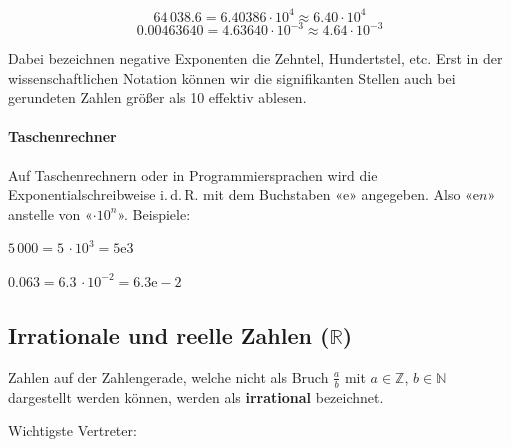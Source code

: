 $$64\,038.6  = 6.40386 \cdot 10^{ 4}\approx 6.40 \cdot 10^{ 4}$$
$$0.00463640 = 4.63640 \cdot 10^{-3}\approx 4.64 \cdot 10^{-3}$$

Dabei bezeichnen negative Exponenten die Zehntel, Hundertstel, etc.
Erst in der wissenschaftlichen Notation können wir die signifikanten Stellen auch bei gerundeten Zahlen größer als 10 effektiv ablesen.



\paragraph{Taschenrechner} Auf Taschenrechnern oder in
Programmiersprachen wird die Exponentialschreibweise i.\,d.\,R. mit dem
Buchstaben «e» angegeben. Also «e$n$» anstelle von «$\cdot10^{n}$». Beispiele:

$5\,000 = 5\, \cdot 10^{3} = 5\mathrm{e}3$

$0.063 = 6.3\, \cdot 10^{-2} = 6.3\mathrm{e-}2$

\newpage

\subsection{Irrationale und reelle Zahlen ($\mathbb{R}$)}

  Zahlen auf der Zahlengerade, welche nicht als Bruch $\frac{a}{b}$ mit $a\in\mathbb{Z}$, $b \in \mathbb{N}$ dargestellt werden können, werden als \textbf{irrational} bezeichnet.

Wichtigste Vertreter:

\begin{center}
\end{center}


